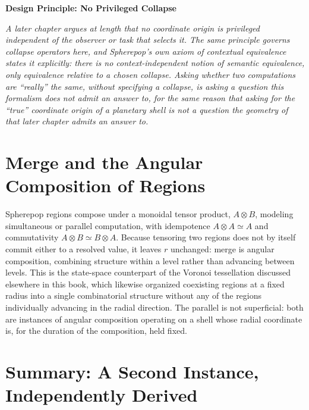 \documentclass[11pt,fleqn]{book}
\numberwithin{equation}{chapter}
\newenvironment{principle}[1]
  {\begin{principleEnv}
   \noindent\textbf{Design Principle: #1}\par\smallskip\itshape}
  {\end{principleEnv}}
\theoremstyle{plain}
\theoremstyle{definition}
\theoremstyle{remark}
\providecommand{\enquote}[1]{``#1''}
\begin{document}
\begin{principle}{No Privileged Collapse}
A later chapter argues at length that no coordinate origin is privileged independent of the observer or task that selects it. The same principle governs collapse operators here, and Spherepop's own axiom of contextual equivalence states it explicitly: there is no context-independent notion of semantic equivalence, only equivalence relative to a chosen collapse. Asking whether two computations are \enquote{really} the same, without specifying a collapse, is asking a question this formalism does not admit an answer to, for the same reason that asking for the \enquote{true} coordinate origin of a planetary shell is not a question the geometry of that later chapter admits an answer to.
\end{principle}

\section{Merge and the Angular Composition of Regions}

Spherepop regions compose under a monoidal tensor product, \(A\otimes B\), modeling simultaneous or parallel computation, with idempotence \(A\otimes A\simeq A\) and commutativity \(A\otimes B\simeq B\otimes A\). Because tensoring two regions does not by itself commit either to a resolved value, it leaves \(r\) unchanged: merge is angular composition, combining structure within a level rather than advancing between levels. This is the state-space counterpart of the Voronoi tessellation discussed elsewhere in this book, which likewise organized coexisting regions at a fixed radius into a single combinatorial structure without any of the regions individually advancing in the radial direction. The parallel is not superficial: both are instances of angular composition operating on a shell whose radial coordinate is, for the duration of the composition, held fixed.

\section{Summary: A Second Instance, Independently Derived}
\end{document}
